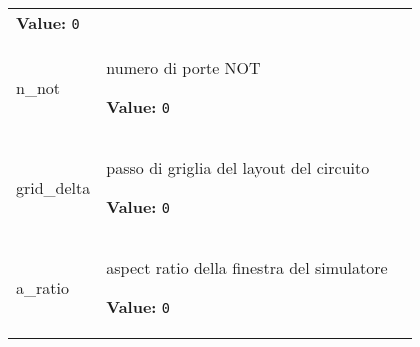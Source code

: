 \begin{longtable}{|p{\varnamewidth}|p{\vardescrwidth}|l}
\textbf{Value:} 
{\tt 0}&\\
\cline{1-2}
\raggedright n\-\_\-n\-o\-t\- & \raggedright numero di porte NOT

\textbf{Value:} 
{\tt 0}&\\
\cline{1-2}
\raggedright g\-r\-i\-d\-\_\-d\-e\-l\-t\-a\- & \raggedright passo di griglia del layout del circuito

\textbf{Value:} 
{\tt 0}&\\
\cline{1-2}
\raggedright a\-\_\-r\-a\-t\-i\-o\- & \raggedright aspect ratio della finestra del simulatore

\textbf{Value:} 
{\tt 0}&\\
\cline{1-2}
\end{longtable}

